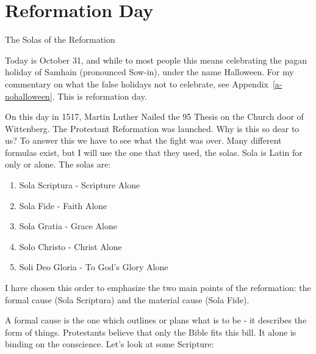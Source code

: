 \chapter{Reformation Day}\label{c-reformationday}

  The Solas of the Reformation
  
Today is October 31, and while to most people this means celebrating the pagan holiday of Samhain (pronounced Sow-in), under the name Halloween.  For my commentary on what the false holidays not to celebrate, see Appendix~\ref{a-nohalloween}.  This is reformation day.

On this day in 1517, Martin Luther Nailed the 95 Thesis on the Church door of Wittenberg.  The Protestant Reformation was launched.  Why is this so dear to us?  To answer this we have to see what the fight was over.  Many different formulas exist, but I will use the one that they used, the solas.  Sola is Latin for only or alone.  The solas are: \begin{enumerate}
\item Sola Scriptura - Scripture Alone
\item Sola Fide - Faith Alone
\item Sola Gratia - Grace Alone
\item Solo Christo - Christ Alone
\item Soli Deo Gloria - To God's Glory Alone
\end{enumerate}
I have chosen this order to emphasize the two main points of the reformation: the formal cause (Sola Scriptura) and the material cause (Sola Fide).

A formal cause is the one which outlines or plans what is to be - it describes the form of things.  Protestants believe that only the Bible fits this bill.  It alone is binding on the conscience.  Let's look at some Scripture:

